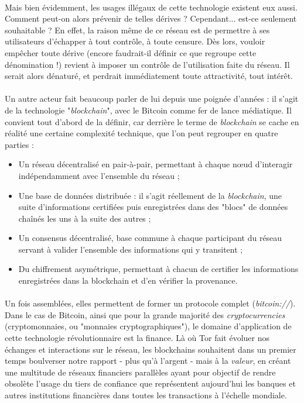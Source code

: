 \paragraph{} Mais bien évidemment, les usages illégaux de cette technologie existent eux aussi. Comment peut-on alors 
prévenir de telles dérives ? Cependant... est-ce seulement souhaitable ? En effet, la raison même de ce réseau est de
permettre à ses utilisateurs d'échapper à tout contrôle, à toute censure. Dès lors, vouloir empêcher toute dérive (encore
faudrait-il définir ce que regroupe cette dénomination !) revient à imposer un contrôle de l'utilisation faite du réseau.
Il serait alors dénaturé, et perdrait immédiatement toute attractivité, tout intérêt.

\paragraph{} Un autre acteur fait beaucoup parler de lui depuis une poignée d'années : il s'agit de la technologie 
"\emph{blockchain}", avec le Bitcoin comme fer de lance médiatique. Il convient tout d'abord de la définir, car derrière 
le terme de \emph{blockchain} se cache en réalité une certaine complexité technique, que l'on peut regrouper en quatre parties :

\begin{itemize}
    \item Un réseau décentralisé en pair-à-pair, permettant à chaque n\oe{}ud d'interagir indépendamment avec l'ensemble 
    du réseau ;
    \item Une base de données distribuée : il s'agit réellement de la \emph{blockchain}, une suite d'informations certifiées
    puis enregistrées dans des "blocs" de données chaînés les uns à la suite des autres ;
    \item Un consensus décentralisé, base commune à chaque participant du réseau servant à valider l'ensemble des informations
    qui y transitent ;
    \item Du chiffrement asymétrique, permettant à chacun de certifier les informations enregistrées dans la blockchain et
    d'en vérifier la provenance.
\end{itemize}

\paragraph{} Un fois assemblées, elles permettent de former un protocole complet (\emph{bitcoin://}). Dans le cas de Bitcoin,
ainsi que pour la grande majorité des \emph{cryptocurrencies} (cryptomonnaies, ou "monnaies cryptographiques"), le domaine d'application
de cette technologie révolutionnaire est la finance. Là où Tor fait évoluer nos échanges et interactions sur le réseau, 
les blockchains souhaitent dans un premier temps boulverser notre rapport - plus qu'à l'argent - mais à la \emph{valeur}, 
en créant une multitude de réseaux financiers parallèles ayant pour objectif de rendre obsolète l'usage du tiers de confiance
que représentent aujourd'hui les banques et autres institutions financières dans toutes les transactions à l'échelle mondiale.

